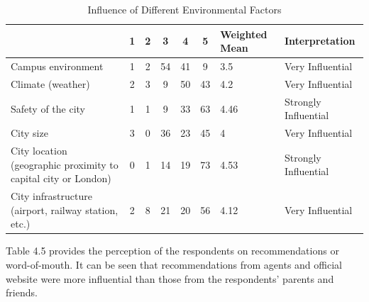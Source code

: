 \begin{table}[H]
\centering
\caption{Influence of Different Environmental Factors
}
\label{my-label}
\begin{tabular}{|p{4cm}|c|c|c|c|c|p{2cm}|p{3cm}|}
\hline
                                                               & \textbf{1} & \textbf{2} & \textbf{3} & \textbf{4} & \textbf{5} & \textbf{Weighted Mean} & \textbf{Interpretation} \\ \hline
Campus environment                                             & 1          & 2          & 54         & 41         & 9          & 3.5                    & Very Influential        \\ \hline
Climate (weather)                                              & 2          & 3          & 9          & 50         & 43         & 4.2                    & Very Influential        \\ \hline
Safety of the city                                             & 1          & 1          & 9          & 33         & 63         & 4.46                   & Strongly Influential    \\ \hline
City size                                                      & 3          & 0          & 36         & 23         & 45         & 4                      & Very Influential        \\ \hline
City location (geographic proximity to capital city or London) & 0          & 1          & 14         & 19         & 73         & 4.53                   & Strongly Influential    \\ \hline
City infrastructure (airport, railway station, etc.)           & 2          & 8          & 21         & 20         & 56         & 4.12                   & Very Influential        \\ \hline
\end{tabular}
\end{table}


Table 4.5 provides the perception of the respondents on recommendations or word-of-mouth. It can be seen that recommendations from agents and official website were more influential than those from the respondents’ parents and friends.

